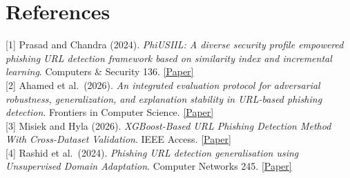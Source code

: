 \documentclass[10pt]{article}
\begin{document}
\section*{References}
\vspace{-3pt}
{\small
[1] Prasad and Chandra (2024). \emph{PhiUSIIL: A diverse security profile empowered phishing URL detection framework based on similarity index and incremental learning}. Computers \& Security 136. \href{https://doi.org/10.1016/j.cose.2023.103545}{[Paper]}\\[0pt]
[2] Ahamed et al.\ (2026). \emph{An integrated evaluation protocol for adversarial robustness, generalization, and explanation stability in URL-based phishing detection}. Frontiers in Computer Science. \href{https://doi.org/10.3389/fcomp.2026.1834407}{[Paper]}\\[0pt]
[3] Misiek and Hyla (2026). \emph{XGBoost-Based URL Phishing Detection Method With Cross-Dataset Validation}. IEEE Access. \href{https://doi.org/10.1109/ACCESS.2026.3672690}{[Paper]}\\[0pt]
[4] Rashid et al.\ (2024). \emph{Phishing URL detection generalisation using Unsupervised Domain Adaptation}. Computer Networks 245. \href{https://doi.org/10.1016/j.comnet.2024.110398}{[Paper]}
}
\end{document}
